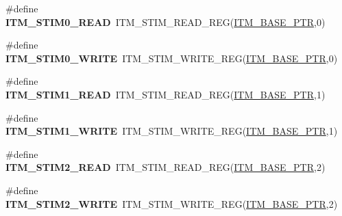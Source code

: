 \begin{DoxyCompactItemize}
\item 
\hypertarget{group___i_t_m___register___accessor___macros_ga41eefae93b44a2616fd9feac9188bd5b}{}\#define {\bfseries I\+T\+M\+\_\+\+S\+T\+I\+M0\+\_\+\+R\+E\+A\+D}~I\+T\+M\+\_\+\+S\+T\+I\+M\+\_\+\+R\+E\+A\+D\+\_\+\+R\+E\+G(\hyperlink{group___i_t_m___peripheral_gafaddee8fe8b6a898d4e5edc43ee0d703}{I\+T\+M\+\_\+\+B\+A\+S\+E\+\_\+\+P\+T\+R},0)\label{group___i_t_m___register___accessor___macros_ga41eefae93b44a2616fd9feac9188bd5b}

\item 
\hypertarget{group___i_t_m___register___accessor___macros_gac29b16f3533cac91bfa55b3ed6a9e14d}{}\#define {\bfseries I\+T\+M\+\_\+\+S\+T\+I\+M0\+\_\+\+W\+R\+I\+T\+E}~I\+T\+M\+\_\+\+S\+T\+I\+M\+\_\+\+W\+R\+I\+T\+E\+\_\+\+R\+E\+G(\hyperlink{group___i_t_m___peripheral_gafaddee8fe8b6a898d4e5edc43ee0d703}{I\+T\+M\+\_\+\+B\+A\+S\+E\+\_\+\+P\+T\+R},0)\label{group___i_t_m___register___accessor___macros_gac29b16f3533cac91bfa55b3ed6a9e14d}

\item 
\hypertarget{group___i_t_m___register___accessor___macros_ga0539c5b663891628a5157b9e06be3327}{}\#define {\bfseries I\+T\+M\+\_\+\+S\+T\+I\+M1\+\_\+\+R\+E\+A\+D}~I\+T\+M\+\_\+\+S\+T\+I\+M\+\_\+\+R\+E\+A\+D\+\_\+\+R\+E\+G(\hyperlink{group___i_t_m___peripheral_gafaddee8fe8b6a898d4e5edc43ee0d703}{I\+T\+M\+\_\+\+B\+A\+S\+E\+\_\+\+P\+T\+R},1)\label{group___i_t_m___register___accessor___macros_ga0539c5b663891628a5157b9e06be3327}

\item 
\hypertarget{group___i_t_m___register___accessor___macros_gadb4269a2c1aae622c11d8e38853bf0d3}{}\#define {\bfseries I\+T\+M\+\_\+\+S\+T\+I\+M1\+\_\+\+W\+R\+I\+T\+E}~I\+T\+M\+\_\+\+S\+T\+I\+M\+\_\+\+W\+R\+I\+T\+E\+\_\+\+R\+E\+G(\hyperlink{group___i_t_m___peripheral_gafaddee8fe8b6a898d4e5edc43ee0d703}{I\+T\+M\+\_\+\+B\+A\+S\+E\+\_\+\+P\+T\+R},1)\label{group___i_t_m___register___accessor___macros_gadb4269a2c1aae622c11d8e38853bf0d3}

\item 
\hypertarget{group___i_t_m___register___accessor___macros_ga34d8d4f75c9b1761c099b65fc7b2073e}{}\#define {\bfseries I\+T\+M\+\_\+\+S\+T\+I\+M2\+\_\+\+R\+E\+A\+D}~I\+T\+M\+\_\+\+S\+T\+I\+M\+\_\+\+R\+E\+A\+D\+\_\+\+R\+E\+G(\hyperlink{group___i_t_m___peripheral_gafaddee8fe8b6a898d4e5edc43ee0d703}{I\+T\+M\+\_\+\+B\+A\+S\+E\+\_\+\+P\+T\+R},2)\label{group___i_t_m___register___accessor___macros_ga34d8d4f75c9b1761c099b65fc7b2073e}

\item 
\hypertarget{group___i_t_m___register___accessor___macros_gaef5fd73197cf69307c400cd33e9d5c0a}{}\#define {\bfseries I\+T\+M\+\_\+\+S\+T\+I\+M2\+\_\+\+W\+R\+I\+T\+E}~I\+T\+M\+\_\+\+S\+T\+I\+M\+\_\+\+W\+R\+I\+T\+E\+\_\+\+R\+E\+G(\hyperlink{group___i_t_m___peripheral_gafaddee8fe8b6a898d4e5edc43ee0d703}{I\+T\+M\+\_\+\+B\+A\+S\+E\+\_\+\+P\+T\+R},2)\label{group___i_t_m___register___accessor___macros_gaef5fd73197cf69307c400cd33e9d5c0a}


\end{DoxyCompactItemize}

